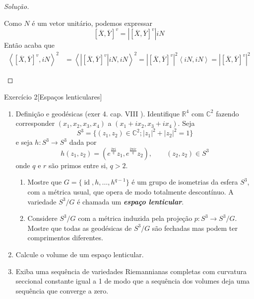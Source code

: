 \begin{proof}[Solução]
\begin{enumerate}[label=(\alph*)]
Como \(N\) é um vetor unitário, podemos expressar 
\[\left[ \overline{X},\overline{Y} \right]^v=\left|\left[ \overline{X},\overline{Y} \right]^v\right| i N\]
Então acaba que
\begin{align*}
\left<\left[ \overline{X},\overline{Y} \right]^v, iN\right>^2&=\left<\left|\left[ \overline{X},\overline{Y} \right]^v\right| i N, i N\right>^2=\left|\left[ \overline{X},\overline{Y} \right]^v\right|^2 \left<i N, i N\right>=\left|\left[ \overline{X},\overline{Y} \right]^v\right|^2
\end{align*}
\end{enumerate}
\end{proof}

\begin{thing6}{Exercício 2}[Espaços lenticulares]\label{exer:2}\leavevmode
\begin{enumerate}[label=(\alph*)]
\item Definição e geodésicas (exer 4. cap. VIII \cite{doc}). Identifique \(\mathbb{R}^4\) com \(\mathbb{C}^2\) fazendo corresponder \((x_1,x_2,x_3,x_4)\) a \((x_1+ix_2,x_3+ix_4)\). Seja
	\[S^3=\{(z_1,z_2) \in \mathbb{C}^{2};|z_1|^2+|z_2|^2=1\}\]
	e seja \(h:S^3 \to S^3\) dada por
	\[h(z_1,z_2)=\left(e^{\frac{2\pi i}{q}}z_1,e^{\frac{2\pi i r}{q}}z_2\right) , \qquad  (z_2,z_2) \in S^3\]
	onde \(q \) e \(r\) são primos entre si, \(q>2\).
	\begin{enumerate}[label=(\roman*)]
	\item Mostre que \(G=\{\operatorname{id},h,\ldots, h ^{q-1}\}\) é um grupo de isometrias da esfera \(S^3\), com a métrica usual, que opera de modo totalmente descontínuo. A variedade \(S^3/G\) é chamada um \textit{\textbf{espaço lenticular}}.
	\item Considere \(S^3/G\) com a métrica induzida pela projeção \(p:S^3 \to S^3/G\). Mostre que todas as geodésicas de \(S^3/G\) são fechadas mas podem ter comprimentos diferentes.
	\end{enumerate}
\item Calcule o volume de um espaço lenticular.
\item Exiba uma sequência de variedades Riemannianas completas com curvatura seccional constante igual a 1 de modo que a sequência dos volumes deja uma sequência que converge a zero.

\end{enumerate}
\end{thing6}

